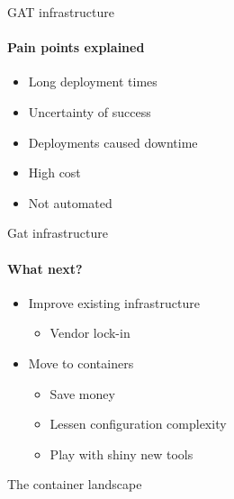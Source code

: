 \documentclass[17pt]{beamer}
\newcommand{\imageframe}[2]{{
  \usebackgroundtemplate{\texttt{[image: \#1]}}
  \begin{frame}{
    \vspace{-6pt}\usebeamercolor[fg]{item}
    \pgfsetfillopacity{0.8}
    \begin{snugshade}
    \centering #2
    \end{snugshade}
  }
  \end{frame}
}}
\begin{document}
  \begin{frame}{GAT infrastructure}
  \framesubtitle{Pain points explained}
  \begin{itemize}
    \item<1-> Long deployment times
    \item<2-> Uncertainty of success
    \item<3-> Deployments caused downtime
    \item<4-> High cost
    \item<5-> Not automated
  \end{itemize}
  \end{frame}

  \begin{frame}{Gat infrastructure}
  \framesubtitle{What next?}
  \begin{itemize}
    \item<1-> Improve existing infrastructure
    \begin{itemize}
      \item Vendor lock-in
    \end{itemize}
    \bigskip
    \item<2-> Move to containers
    \begin{itemize}
      \item Save money
      \item Lessen configuration complexity
      \item Play with shiny new tools
    \end{itemize}
  \end{itemize}
  \end{frame}


  \imageframe{images/container_landscape.jpg}{The container landscape}
\end{document}

